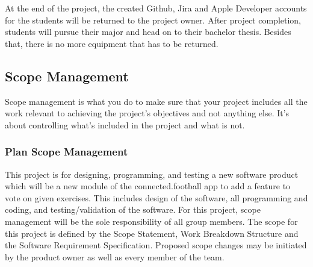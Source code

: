 At the end of the project, the created Github, Jira and Apple Developer accounts for the students will be returned to the project owner. \newline
After project completion, students will pursue their major and head on to their bachelor thesis.\newline
Besides that, there is no more equipment that has to be returned.



\subsection{Scope Management}
\label{ssec:scope_management}

Scope management is what you do to make sure that your project includes all the work relevant to achieving the project’s objectives and not anything else. It’s about controlling what’s included in the project and what is not.

\subsubsection{Plan Scope Management}
\label{sssec:plan_scope_management}

This project is for designing, programming, and testing a new software product which will be a new module of the connected.football app to add a feature to vote on given exercises. This includes design of the software, all programming and coding, and testing/validation of the software.
\newline
For this project, scope management will be the sole responsibility of all group members. The scope for this project is defined by the Scope Statement, Work Breakdown Structure and the Software Requirement Specification. Proposed scope changes may be initiated by the product owner as well as every member of the team.

